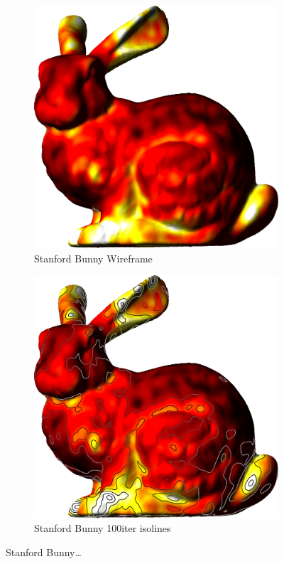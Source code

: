 \begin{figure}[ht]
{	\bigskip
	\begin{subfigure}[b]{0.48\linewidth}
		\includegraphics[width=1.0\linewidth,height=0.3\textheight,keepaspectratio]{data/acquired_meshes/bun_zipper_edited_r1_n4_v256_funcvals_100iter.png}
		\caption{Stanford Bunny Wireframe}\label{fig:bun.e}
	\end{subfigure}
	\begin{subfigure}[b]{0.48\linewidth}
		\includegraphics[width=1.0\linewidth,height=0.3\textheight,keepaspectratio]{data/acquired_meshes/bun_zipper_edited_r1_n4_v256_funcvals_isolines_100iter.png}
		\caption{Stanford Bunny 100iter isolines}\label{fig:bun.f}
	\end{subfigure}}
	{\caption[Stanford Bunny]{Stanford Bunny\ldots}\label{fig:bun}}
\end{figure}



